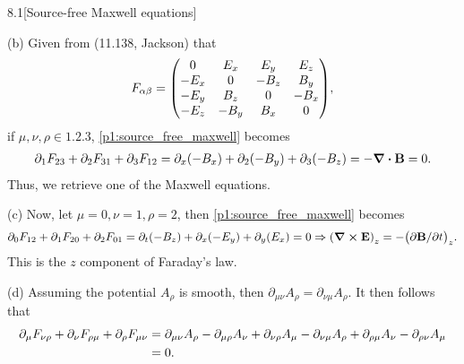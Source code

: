 \documentclass[12pt]{article}
\begin{document}
\begin{problem}{8.1}[Source-free Maxwell equations]
\begin{solution}
(b) Given from (11.138, Jackson) that
\begin{equation}
    F_{\alpha\beta}=\mqty(
        0&E_x&E_y&E_z\\-E_x&0&-B_z&B_y\\-E_y&B_z&0&-B_x\\
        -E_z&-B_y&B_x&0),
\end{equation}
if $\mu,\nu,\rho\in\qty{1,2,3}$, \eqref{p1:source_free_maxwell} becomes
\begin{align}
    \partial_1F_{23}+\partial_2F_{31}+\partial_3F_{12}
    =\partial_x(-B_x)+\partial_2(-B_y)+\partial_3(-B_z)
    =-\div{\vb{B}}=0.
\end{align}
Thus, we retrieve one of the Maxwell equations.

(c) Now, let $\mu=0,\nu=1,\rho=2$, then \eqref{p1:source_free_maxwell} becomes
\begin{align}
    \partial_0 F_{12}
    +\partial_1 F_{20}
    +\partial_2F_{01}
    =\partial_t(-B_z)
    +\partial_x(-E_y)
    +\partial_y(E_x)
    =0
    \Rightarrow\qty(\curl{\vb{E}})_z=-\qty(\partial\vb{B}/\partial t)_z.
\end{align}
This is the $z$ component of Faraday's law.

(d) Assuming the potential $A_\rho$ is smooth, then
$\partial_{\mu\nu}A_\rho=\partial_{\nu\mu}A_\rho$. It then follows that
\begin{align}
    \partial_\mu F_{\nu\rho}+\partial_\nu F_{\rho\mu}+\partial_\rho F_{\mu\nu}
    &=\partial_{\mu\nu}A_\rho-\partial_{\mu\rho}A_\nu
    +\partial_{\nu\rho}A_\mu-\partial_{\nu\mu}A_\rho
    +\partial_{\rho\mu}A_\nu-\partial_{\rho\nu}A_\mu\notag\\
    &=0.
\end{align}
\end{solution}
\end{problem}
\newpage
\end{document}
